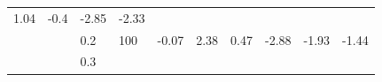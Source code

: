 \documentclass[12pt,oneside,a4paper]{reedthesis}
\begin{document}
\begin{longtable}[]{@{}llllllllll@{}}
\begin{minipage}[t]{0.07\columnwidth}
1.04\strut
\end{minipage} & \begin{minipage}[t]{0.07\columnwidth}\raggedright
-0.4\strut
\end{minipage} & \begin{minipage}[t]{0.09\columnwidth}\raggedright
-2.85\strut
\end{minipage} & \begin{minipage}[t]{0.09\columnwidth}\raggedright
-2.33\strut
\end{minipage}\tabularnewline
\begin{minipage}[t]{0.11\columnwidth}\raggedright
\strut
\end{minipage} & \begin{minipage}[t]{0.05\columnwidth}\raggedright
\strut
\end{minipage} & \begin{minipage}[t]{0.05\columnwidth}\raggedright
0.2\strut
\end{minipage} & \begin{minipage}[t]{0.05\columnwidth}\raggedright
100\strut
\end{minipage} & \begin{minipage}[t]{0.07\columnwidth}\raggedright
-0.07\strut
\end{minipage} & \begin{minipage}[t]{0.07\columnwidth}\raggedright
2.38\strut
\end{minipage} & \begin{minipage}[t]{0.07\columnwidth}\raggedright
0.47\strut
\end{minipage} & \begin{minipage}[t]{0.07\columnwidth}\raggedright
-2.88\strut
\end{minipage} & \begin{minipage}[t]{0.09\columnwidth}\raggedright
-1.93\strut
\end{minipage} & \begin{minipage}[t]{0.09\columnwidth}\raggedright
-1.44\strut
\end{minipage}\tabularnewline
\begin{minipage}[t]{0.11\columnwidth}\raggedright
\strut
\end{minipage} & \begin{minipage}[t]{0.05\columnwidth}\raggedright
\strut
\end{minipage} & \begin{minipage}[t]{0.05\columnwidth}\raggedright
0.3\strut
\end{minipage} & \begin{minipage}[t]{0.05\columnwidth}\raggedright

\end{minipage}
\end{longtable}
\end{document}
